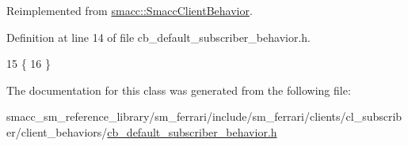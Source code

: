 Reimplemented from \hyperlink{classsmacc_1_1SmaccClientBehavior_ad5d3e1f1697c3cfe66c94cadba948493}{smacc\+::\+Smacc\+Client\+Behavior}.



Definition at line 14 of file cb\+\_\+default\+\_\+subscriber\+\_\+behavior.\+h.


\begin{DoxyCode}
15     \{
16     \}
\end{DoxyCode}


The documentation for this class was generated from the following file\+:\begin{DoxyCompactItemize}
\item 
smacc\+\_\+sm\+\_\+reference\+\_\+library/sm\+\_\+ferrari/include/sm\+\_\+ferrari/clients/cl\+\_\+subscriber/client\+\_\+behaviors/\hyperlink{sm__ferrari_2include_2sm__ferrari_2clients_2cl__subscriber_2client__behaviors_2cb__default__subscriber__behavior_8h}{cb\+\_\+default\+\_\+subscriber\+\_\+behavior.\+h}\end{DoxyCompactItemize}
